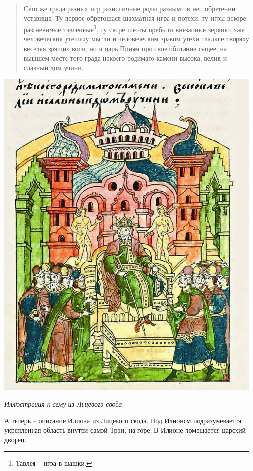 \begin{quotation}
Сего же града разных игр разноличные роды разными в неи обретении уставиша. Ту первое обретошася шахматная игра и потехи, ту игры вскоре разгневимые тавлеиные\footnote{Тавлея – игра в шашки.}, ту скоре шкоты пребыти внезапные зернию, яже человеческия утешаху мысли и человеческим зраком утехи сладкие творяху веселяя зрящих воли, но и царь Приям про свое обитание сущее, на вышшем месте того града некоего родимаго камени высока, велии и славныи дом учини.
\end{quotation}

\vspace*{\fill}
\begin{center}
\includegraphics[width=\linewidth]{chast-troya/drugie/svod-01.jpg}

\textit{Иллюстрация к сему из Лицевого свода.}
\end{center}
\vspace*{\fill}
\newpage

А теперь – описание Илиона из Лицевого свода. Под Илионом подразумевается укрепленная область внутри самой Трои, на горе. В Илионе помещается царский дворец.

